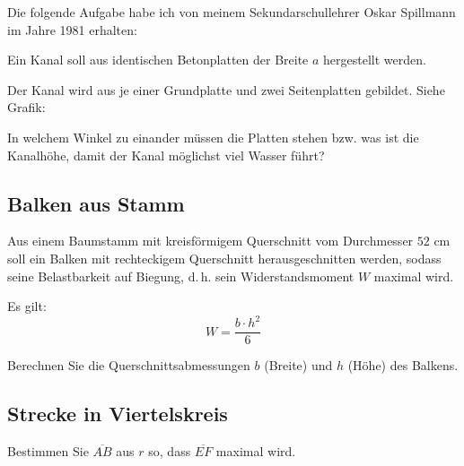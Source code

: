 Die folgende Aufgabe habe ich von meinem Sekundarschullehrer Oskar
Spillmann im Jahre 1981 erhalten:

Ein Kanal soll aus identischen Betonplatten der Breite $a$ hergestellt werden.

Der Kanal wird aus je einer Grundplatte und zwei Seitenplatten
gebildet. Siehe Grafik:


In welchem Winkel zu einander müssen die Platten stehen bzw. was ist
die Kanalhöhe, damit der Kanal möglichst viel Wasser führt?

\subsection{Balken aus Stamm}

Aus einem Baumstamm mit kreisförmigem Querschnitt vom Durchmesser
$52 \text{ cm}$ soll ein
Balken mit rechteckigem Querschnitt herausgeschnitten werden, sodass
seine Belastbarkeit auf Biegung, d.\,h. sein Widerstandsmoment $W$
maximal wird.

Es gilt:
$$W = \frac{b\cdot{}h^2}6$$

Berechnen Sie die Querschnittsabmessungen $b$ (Breite) und $h$ (Höhe) des Balkens.


\subsection{Strecke in Viertelskreis}

Bestimmen Sie $\overline{AB}$ aus $r$ so, dass $\overline{EF}$ maximal
wird.



